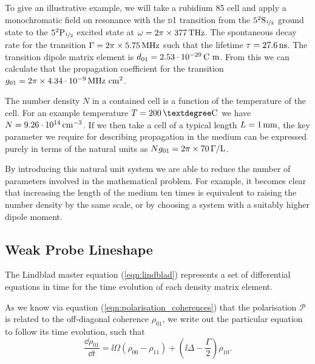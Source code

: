     To give an illustrative example, we will take a rubidium 85 cell and apply a
    monochromatic field on resonance with the \textsc{d1} transition from the
    $5^2\mathrm{S}_{\nicefrac{1}{2}}$ ground state to the
    $5^2\mathrm{P}_{\nicefrac{1}{2}}$ excited state at $\omega =
    \unit[2\pi\times377]{THz}$. The spontaneous decay rate for the transition
    $\Gamma = \unit[2\pi\times5.75]{MHz}$ such that the lifetime $\tau =
    \unit[27.6]{ns}$. The transition dipole matrix element is $d_{01} =
    \unit[2.53\cdot10^{-29}]{C~m}$. From this we can calculate that the
    propagation coefficient for the transition $g_{01} =
    \unit[2\pi\times4.34\cdot10^{-9}]{MHz~cm^2}$.

    The number density $N$ in a contained cell is a function of the temperature
    of the cell. For an example temperature $T = \unit[200]{\textdegree C}$ we
    have $N = \unit[9.26\cdot10^{14}]{cm^{-3}}$. If we then take a cell of a
    typical length $L = \unit[1]{mm}$, the key parameter we require for
    describing propagation in the medium can be expressed purely in terms of the
    natural units as $N g_{01} = \unit[2\pi\times70]{\Gamma /L}$.

    By introducing this natural unit system we are able to reduce the number of
    parameters involved in the mathematical problem. For example, it becomes
    clear that increasing the length of the medium ten times is equivalent to
    raising the number density by the same scale, or by choosing a system with a
    suitably higher dipole moment.

  \subsection{Weak Probe Lineshape}    

    The Lindblad master equation (\ref{eqn:lindblad}) represents a set of
    differential equations in time for the time evolution of each density matrix
    element.

    As we know via equation (\ref{eqn:polarisation_coherences}) that the
    polarisation $\mathcal{P}$ is related to the off-diagonal coherence
    $\rho_{01}$, we write out the particular equation to follow its time
    evolution, such that
    \begin{equation}
      \label{eqn:twolevel_coh_master_eqn}
      \frac{\dd \rho_{01}}{\dd t} = \ii \Omega \left( \rho_{00} - \rho_{11} \right) + \left( \ii \Delta - \frac{\Gamma}{2} \right) \rho_{10}.
    \end{equation}

